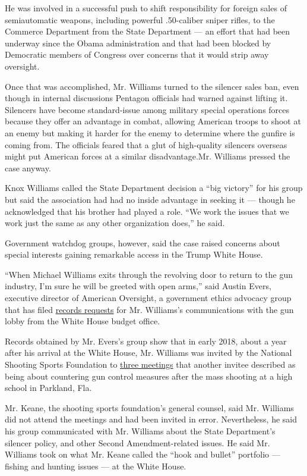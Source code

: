 He was involved in a successful push to shift responsibility for foreign
sales of semiautomatic weapons, including powerful .50-caliber sniper
rifles, to the Commerce Department from the State Department --- an
effort that had been underway since the Obama administration and that
had been blocked by Democratic members of Congress over concerns that it
would strip away oversight.

Once that was accomplished, Mr. Williams turned to the silencer sales
ban, even though in internal discussions Pentagon officials had warned
against lifting it. Silencers have become standard-issue among military
special operations forces because they offer an advantage in combat,
allowing American troops to shoot at an enemy but making it harder for
the enemy to determine where the gunfire is coming from. The officials
feared that a glut of high-quality silencers overseas might put American
forces at a similar disadvantage.Mr. Williams pressed the case anyway.

Knox Williams called the State Department decision a ``big victory'' for
his group but said the association had had no inside advantage in
seeking it --- though he acknowledged that his brother had played a
role. ``We work the issues that we work just the same as any other
organization does,'' he said.

Government watchdog groups, however, said the case raised concerns about
special interests gaining remarkable access in the Trump White House.

``When Michael Williams exits through the revolving door to return to
the gun industry, I'm sure he will be greeted with open arms,'' said
Austin Evers, executive director of American Oversight, a government
ethics advocacy group that has filed
\href{https://www.americanoversight.org/document/foia-to-omb-seeking-communications-between-michael-williams-and-gun-rights-advocates}{records
requests} for Mr. Williams's communications with the gun lobby from the
White House budget office.

Records obtained by Mr. Evers's group show that in early 2018, about a
year after his arrival at the White House, Mr. Williams was invited by
the National Shooting Sports Foundation to
\href{https://www.americanoversight.org/document/omb-calendar-invites-and-agenda-for-calls-regarding-the-parkland-shooting}{three
meetings} that another invitee described as being about countering gun
control measures after the mass shooting at a high school in Parkland,
Fla.

Mr. Keane, the shooting sports foundation's general counsel, said Mr.
Williams did not attend the meetings and had been invited in error.
Nevertheless, he said his group communicated with Mr. Williams about the
State Department's silencer policy, and other Second Amendment-related
issues. He said Mr. Williams took on what Mr. Keane called the ``hook
and bullet'' portfolio --- fishing and hunting issues --- at the White
House.


